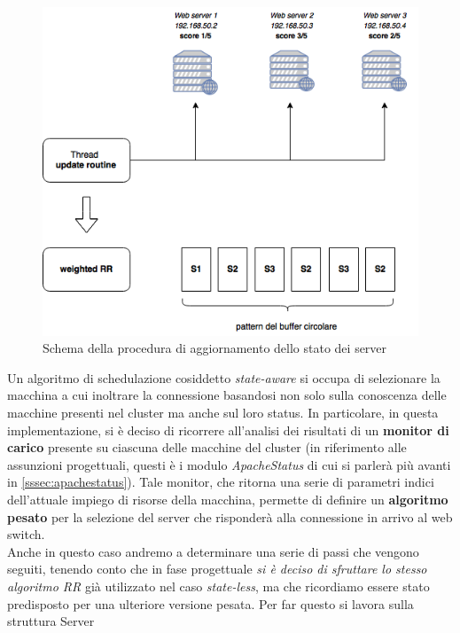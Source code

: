 \documentclass[italian]{tktltiki2}
\begin{document}
\begin{figure}[t]
\centering
\includegraphics[width=\textwidth]{images/rrobin_stateaware}
\caption{Schema della procedura di aggiornamento dello stato dei server
\label{fig:rrobin_sa}}
\end{figure}
Un algoritmo di schedulazione cosiddetto \emph{state-aware} si occupa di selezionare la macchina a cui inoltrare la connessione basandosi non solo sulla conoscenza delle macchine presenti nel cluster ma anche sul loro status. In particolare, in questa implementazione, si è deciso di ricorrere all'analisi dei risultati di un \textbf{monitor di carico} presente su ciascuna delle macchine del cluster (in riferimento alle assunzioni progettuali, questi è i modulo \emph{ApacheStatus} di cui si parlerà più avanti in \ref{sssec:apachestatus}). Tale monitor, che ritorna una serie di parametri indici dell'attuale impiego di risorse della macchina, permette di definire un \textbf{algoritmo pesato} per la selezione del server che risponderà alla connessione in arrivo al web switch. \\
Anche in questo caso andremo a determinare una serie di passi che vengono seguiti, tenendo conto che in fase progettuale \emph{si è deciso di sfruttare lo stesso algoritmo RR} già utilizzato nel caso \emph{state-less}, ma che ricordiamo essere stato predisposto per una ulteriore versione pesata. Per far questo si lavora sulla struttura Server \\\\
\end{document}
